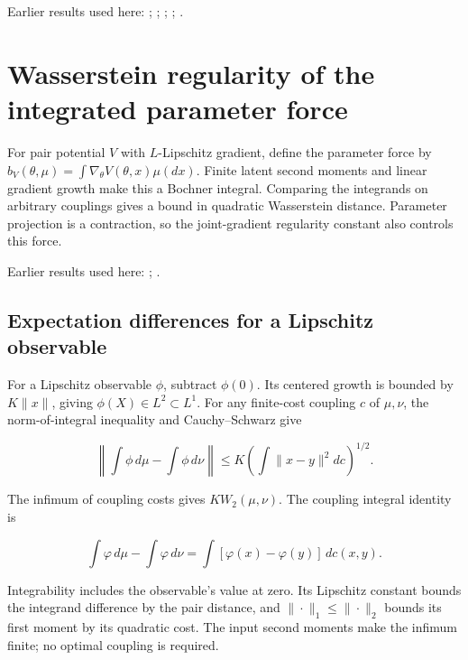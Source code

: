 \documentclass[11pt,a4paper]{report}
\begin{document}
Earlier results used here: \cite[Section~3.17.4]{LangevinLean2026ULASC}; \cite[Section~3.1.1]{LangevinLean2026IPLA}; \cite[Section~3.1.6]{LangevinLean2026IPLA}; \cite[Section~3.3.1]{LangevinLean2026IPLA}; \cite[Section~3.3.2]{LangevinLean2026IPLA}.
\section{\texorpdfstring{Wasserstein regularity of the integrated parameter force}{Wasserstein regularity of the integrated parameter force}}
\label{proof-module-ProximalLangevin-MeanFieldDrift-lean}


For pair potential \(V\) with \(L\)-Lipschitz gradient, define the parameter force by \(b_V(\theta,\mu)=\int\nabla_\theta V(\theta,x)\mu(dx)\). Finite latent second moments and linear gradient growth make this a Bochner integral. Comparing the integrands on arbitrary couplings gives a bound in quadratic Wasserstein distance. Parameter projection is a contraction, so the joint-gradient regularity constant also controls this force.



Earlier results used here: \cite[Section~3.21]{LangevinLean2026ULASC}; \cite[Section~3.22]{LangevinLean2026ULASC}.
\subsection{\texorpdfstring{Expectation differences for a Lipschitz observable}{Expectation differences for a Lipschitz observable}}
\label{report-step-ProximalLangevin-MeanFieldDrift-lean-1}


For a Lipschitz observable \(\phi\), subtract \(\phi(0)\). Its centered growth is bounded by \(K\|x\|\), giving \(\phi(X)\in L^2\subset L^1\). For any finite-cost coupling \(c\) of \(\mu,\nu\), the norm-of-integral inequality and Cauchy–Schwarz give

\[\left\|\int\phi\,d\mu-\int\phi\,d\nu\right\|\le K\left(\int\|x-y\|^2dc\right)^{1/2}.\]

The infimum of coupling costs gives \(K W_2(\mu,\nu)\). The coupling integral identity is

\[\int\varphi\,d\mu-\int\varphi\,d\nu=\int[\varphi(x)-\varphi(y)]\,dc(x,y).\]

Integrability includes the observable’s value at zero. Its Lipschitz constant bounds the integrand difference by the pair distance, and \(\|\cdot\|_1\le\|\cdot\|_2\) bounds its first moment by its quadratic cost. The input second moments make the infimum finite; no optimal coupling is required.
\end{document}

